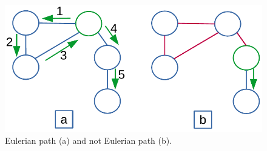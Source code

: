 \begin{figure}[H]
	\begin{center}
		\includegraphics[scale=.6]{chapters/graphs/images/graphs_8.pdf}
		\caption[Eulerian path (a) and not Eulerian path (b).]{Eulerian path (a) and not Eulerian path (b).}
		\label{graphs_8}
	\end{center}
\end{figure}

